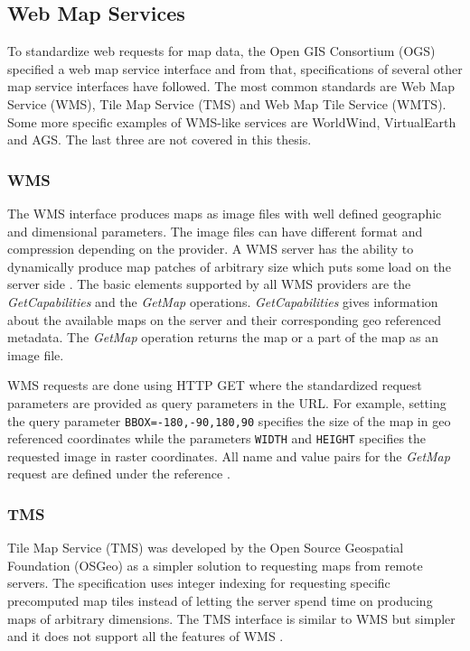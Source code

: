 \subsection{Web Map Services}

To standardize web requests for map data, the Open GIS Consortium (OGS) specified a web map service interface \cite{wms06} and from that, specifications of several other map service interfaces have followed. The most common standards are Web Map Service (WMS), Tile Map Service (TMS) and Web Map Tile Service (WMTS). Some more specific examples of WMS-like services are WorldWind, VirtualEarth and AGS. The last three are not covered in this thesis.

\subsubsection{WMS}

The WMS interface produces maps as image files with well defined geographic and dimensional parameters. The image files can have different format and compression depending on the provider. A WMS server has the ability to dynamically produce map patches of arbitrary size which puts some load on the server side \cite{wms06}. The basic elements supported by all WMS providers are the \emph{GetCapabilities} and the \emph{GetMap} operations. \emph{GetCapabilities} gives information about the available maps on the server and their corresponding geo referenced metadata. The \emph{GetMap} operation returns the map or a part of the map as an image file.

WMS requests are done using HTTP GET where the standardized request parameters are provided as query parameters in the URL\cite{wms06}. For example, setting the query parameter \texttt{BBOX=-180,-90,180,90} specifies the size of the map in geo referenced coordinates while the parameters \texttt{WIDTH} and \texttt{HEIGHT} specifies the requested image in raster coordinates. All name and value pairs for the \emph{GetMap} request are defined under the reference \cite{wms06}.

\subsubsection{TMS}

Tile Map Service (TMS) was developed by the Open Source Geospatial Foundation (OSGeo) as a simpler solution to requesting maps from remote servers. The specification uses integer indexing for requesting specific precomputed map tiles instead of letting the server spend time on producing maps of arbitrary dimensions. The TMS interface is similar to WMS but simpler and it does not support all the features of WMS \cite{tms}.



